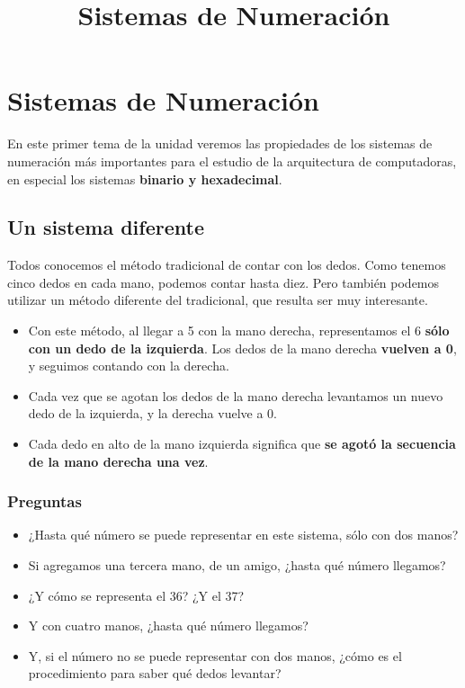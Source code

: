 \documentclass[spanish,a4paper,]{article}
\title{Sistemas de Numeración}
\date{}
\providecommand{\tightlist}{%
  \setlength{\itemsep}{0pt}\setlength{\parskip}{0pt}}
\begin{document}
\maketitle

\hypertarget{sistemas-de-numeraciuxf3n}{%
\section{Sistemas de Numeración}\label{sistemas-de-numeraciuxf3n}}

En este primer tema de la unidad veremos las propiedades de los sistemas
de numeración más importantes para el estudio de la arquitectura de
computadoras, en especial los sistemas \textbf{binario y hexadecimal}.

\hypertarget{un-sistema-diferente}{%
\subsection{Un sistema diferente}\label{un-sistema-diferente}}

Todos conocemos el método tradicional de contar con los dedos. Como
tenemos cinco dedos en cada mano, podemos contar hasta diez. Pero
también podemos utilizar un método diferente del tradicional, que
resulta ser muy interesante.

\begin{itemize}
\tightlist
\item
  Con este método, al llegar a 5 con la mano derecha, representamos el 6
  \textbf{sólo con un dedo de la izquierda}. Los dedos de la mano
  derecha \textbf{vuelven a 0}, y seguimos contando con la derecha.
\item
  Cada vez que se agotan los dedos de la mano derecha levantamos un
  nuevo dedo de la izquierda, y la derecha vuelve a 0.
\item
  Cada dedo en alto de la mano izquierda significa que \textbf{se agotó
  la secuencia de la mano derecha una vez}.
\end{itemize}

\hypertarget{preguntas}{%
\subsubsection{Preguntas}\label{preguntas}}

\begin{itemize}
\tightlist
\item
  ¿Hasta qué número se puede representar en este sistema, sólo con dos
  manos?
\item
  Si agregamos una tercera mano, de un amigo, ¿hasta qué número
  llegamos?
\item
  ¿Y cómo se representa el 36? ¿Y el 37?
\item
  Y con cuatro manos, ¿hasta qué número llegamos?
\item
  Y, si el número no se puede representar con dos manos, ¿cómo es el
  procedimiento para saber qué dedos levantar?
\end{itemize}
\end{document}
